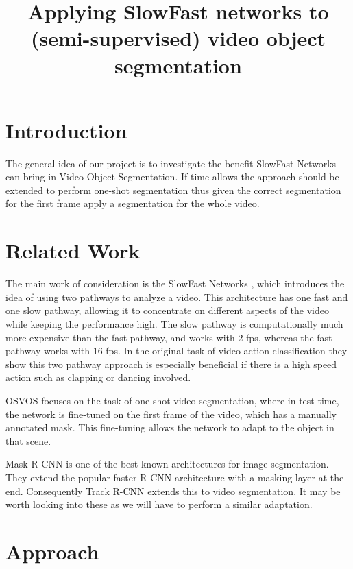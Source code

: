 \documentclass[conference]{IEEEtran}
\begin{document}
\title{Applying SlowFast networks to (semi-supervised) video object segmentation\\
}

\author{
\and
{}
}
\maketitle

\section{Introduction}
The general idea of our project is to investigate the benefit SlowFast Networks \cite{slow_fast} can bring in Video Object Segmentation. If time allows the approach should be extended to perform one-shot segmentation thus given the correct segmentation for the first frame apply a segmentation for the whole video. 

\section{Related Work}
The main work of consideration is the SlowFast Networks \cite{slow_fast}, which introduces the idea of using two pathways to analyze a video. This architecture has one fast and one slow pathway, allowing it to concentrate on different aspects of the video while keeping the performance high. The slow pathway is computationally much more expensive than the fast pathway, and works with 2 fps, whereas the fast pathway works with 16 fps. In the original task of video action classification they show this two pathway approach is especially beneficial if there is a high speed action such as clapping or dancing involved.  

OSVOS \cite{osvos} focuses on the task of one-shot video segmentation, where in test time, the network is fine-tuned on the first frame of the video, which has a manually annotated mask. This fine-tuning allows the network to adapt to the object in that scene.

Mask R-CNN \cite{mask_rcnn} is one of the best known architectures for image segmentation. They extend the popular faster R-CNN architecture with a masking layer at the end. Consequently Track R-CNN \cite{track_rcnn} extends this to video segmentation. It may be worth looking into these as we will have to perform a similar adaptation.


\section{Approach}
\end{document}
